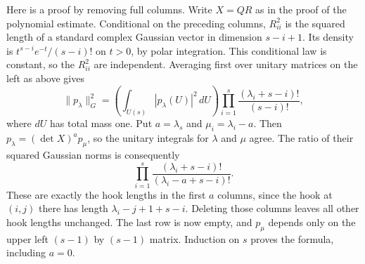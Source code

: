 \documentclass[11pt,letterpaper]{article}
\begin{document}
Here is a proof by removing full columns. Write $X=QR$ as in the proof
of the polynomial estimate. Conditional on the preceding columns,
$R_{ii}^2$ is the squared length of a standard complex Gaussian vector
in dimension $s-i+1$. Its density is $t^{s-i}e^{-t}/(s-i)!$ on $t>0$,
by polar integration. This conditional law is constant, so the
$R_{ii}^2$ are independent. Averaging first over unitary matrices on the
left as above gives
\begin{equation}\label{D:169}
 \|p_\lambda\|_G^2=
 \left(\int_{U(s)}|p_\lambda(U)|^2\,dU\right)
 \prod_{i=1}^s\frac{(\lambda_i+s-i)!}{(s-i)!},
\end{equation}
where $dU$ has total mass one. Put $a=\lambda_s$ and
$\mu_i=\lambda_i-a$. Then $p_\lambda=(\det X)^a p_\mu$, so the
unitary integrals for $\lambda$ and $\mu$ agree. The ratio of their
squared Gaussian norms is consequently
\begin{equation}\label{D:170}
       \prod_{i=1}^s\frac{(\lambda_i+s-i)!}{(\lambda_i-a+s-i)!}.
\end{equation}
These are exactly the hook lengths in the first $a$ columns, since the
hook at $(i,j)$ there has length $\lambda_i-j+1+s-i$. Deleting those
columns leaves all other hook lengths unchanged. The last row is now
empty, and $p_\mu$ depends only on the upper left $(s-1)$ by $(s-1)$
matrix. Induction on $s$ proves the formula, including $a=0$.
\end{document}

